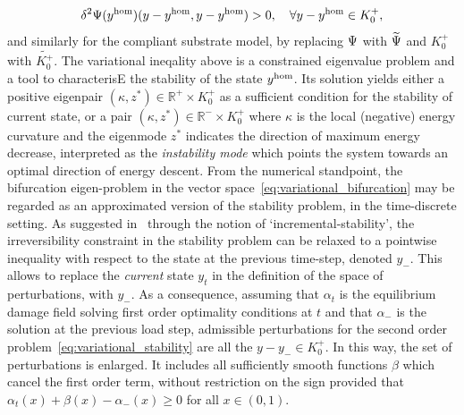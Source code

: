 \newcommand{\conespace}{K^+_{0}}
\begin{equation}
     \label{eq:variational_stability}
     \delta^2 \Psi(\yhom)(y - \yhom,  y - \yhom)  > 0, \quad \forall y-\yhom \in \conespace,
 \end{equation}
and similarly for the compliant substrate model, by replacing $\Psi$ with $\widetilde\Psi$ and $\conespace$ with $\widetilde{\conespace}$.
The variational ineqality above is a constrained eigenvalue problem and a tool to characterisE the stability of the state $y^{\text{hom}}$. Its solution yields either a positive eigenpair $(\kappa, z^*)\in \mathbb{R}^+\times K^+_0$ as a sufficient condition for the stability of current state, or a pair $(\kappa, z^*)\in \mathbb{R}^-\times K^+_0$ where $\kappa$ is the local (negative) energy curvature and the eigenmode $z^*$ indicates the direction of maximum energy decrease, interpreted as the \emph{instability mode} which points the system towards an optimal direction of energy descent. 
From the numerical standpoint, the bifurcation eigen-problem in the vector space~\eqref{eq:variational_bifurcation} may be regarded as an approximated version of the stability problem, in the time-discrete setting. As suggested in~\cite{Baldelli2021-gc} through the notion of `incremental-stability', the irreversibility constraint in the stability problem can be relaxed to a pointwise inequality with respect to the state at the previous time-step, denoted $y_-$.
This allows to replace the \emph{current} state $y_t$ in the definition of the space of perturbations, with $y_-$. As a consequence, assuming that $\alpha_t$ is the equilibrium damage field solving first order optimality conditions at $t$ and that $\alpha_-$ is the solution at the previous load step, admissible perturbations for the second order problem~\eqref{eq:variational_stability} are all the $y-y_-\in \conespace$. In this way, the set of perturbations is enlarged. It includes all sufficiently smooth functions $\beta$ which cancel the first order term, without restriction on the sign provided that $\alpha_t(x) + \beta(x) - \alpha_-(x)\geq 0$ for all $x\in (0, 1)$.
% 
